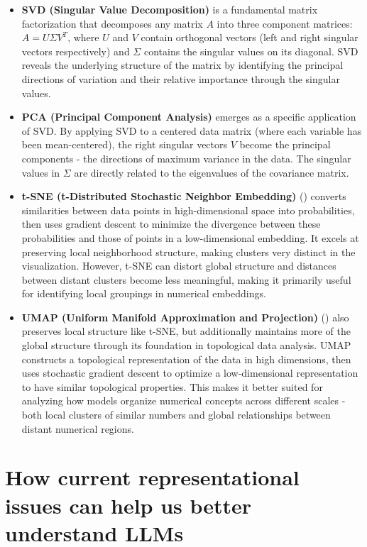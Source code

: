 \documentclass[
  a4paper, twoside, 10pt, titlepage]{book}
\begin{document}
\begin{itemize}
\item
  \textbf{SVD (Singular Value Decomposition)} is a fundamental matrix
  factorization that decomposes any matrix \(A\) into three component
  matrices: \(A = U\Sigma V^T\), where \(U\) and \(V\) contain
  orthogonal vectors (left and right singular vectors respectively) and
  \(\Sigma\) contains the singular values on its diagonal. SVD reveals
  the underlying structure of the matrix by identifying the principal
  directions of variation and their relative importance through the
  singular values.
\item
  \textbf{PCA (Principal Component Analysis)} emerges as a specific
  application of SVD. By applying SVD to a centered data matrix (where
  each variable has been mean-centered), the right singular vectors
  \(V\) become the principal components - the directions of maximum
  variance in the data. The singular values in \(\Sigma\) are directly
  related to the eigenvalues of the covariance matrix.
\item
  \textbf{t-SNE (t-Distributed Stochastic Neighbor Embedding)}
  () converts
  similarities between data points in high-dimensional space into
  probabilities, then uses gradient descent to minimize the divergence
  between these probabilities and those of points in a low-dimensional
  embedding. It excels at preserving local neighborhood structure,
  making clusters very distinct in the visualization. However, t-SNE can
  distort global structure and distances between distant clusters become
  less meaningful, making it primarily useful for identifying local
  groupings in numerical embeddings.
\item
  \textbf{UMAP (Uniform Manifold Approximation and Projection)}
  () also preserves
  local structure like t-SNE, but additionally maintains more of the
  global structure through its foundation in topological data analysis.
  UMAP constructs a topological representation of the data in high
  dimensions, then uses stochastic gradient descent to optimize a
  low-dimensional representation to have similar topological properties.
  This makes it better suited for analyzing how models organize
  numerical concepts across different scales - both local clusters of
  similar numbers and global relationships between distant numerical
  regions.
\end{itemize}

\section{How current representational issues can help us better
understand
LLMs}\label{how-current-representational-issues-can-help-us-better-understand-llms}
\end{document}
